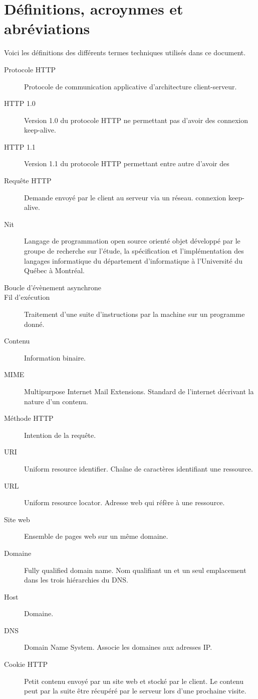 \documentclass{scrreprt}
\begin{document}
\section{Définitions, acroynmes et abréviations}
Voici les définitions des différents termes techniques utilisés dans ce
document.
\begin{description}
\item[Protocole HTTP] Protocole de communication applicative d'architecture
client-serveur\cite{http}.
\item[HTTP 1.0] Version 1.0 du protocole HTTP ne permettant pas d'avoir des
connexion keep-alive.
\item[HTTP 1.1] Version 1.1 du protocole HTTP permettant entre autre d'avoir des
\item[Requête HTTP] Demande envoyé par le client au serveur via un réseau.
connexion keep-alive\cite{http1.0}.
\item[Nit] Langage de programmation open source orienté objet développé par le
groupe de recherche sur l'étude, la spécification et l'implémentation des
langages informatique du département d'informatique à l'Université du Québec à
Montréal.
    \item[Boucle d'évènement asynchrone] 
    \item[Fil d'exécution] Traitement d'une suite d'instructions par la machine sur un programme donné.
    \item[Contenu] Information binaire.
    \item[MIME] Multipurpose Internet Mail Extensions. Standard de l'internet décrivant la nature d'un contenu.
    \item[Méthode HTTP] Intention de la requête.
    \item[URI] Uniform resource identifier. Chaîne de caractères identifiant une ressource.
    \item[URL] Uniform resource locator. Adresse web qui réfère à une ressource.
    \item[Site web] Ensemble de pages web sur un même domaine.
    \item[Domaine] Fully qualified domain name. Nom qualifiant un et un seul emplacement dans les trois hiérarchies du DNS.
    \item[Host] Domaine.
    \item[DNS] Domain Name System. Associe les domaines aux adresses IP.
    \item[Cookie HTTP] Petit contenu envoyé par un site web et stocké par le client. Le contenu peut par la suite être récupéré par le serveur lors d'une prochaine visite.

\end{description}
\end{document}
